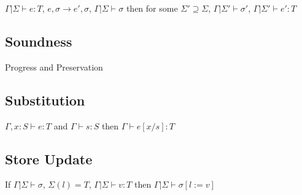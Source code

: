\documentclass[10pt,a4paper]{article}
\begin{document}
$Γ|Σ \vdash e: T$, $e, σ → e', σ$, $Γ|Σ \vdash σ$ then for some $Σ' \supseteq Σ$, $Γ|Σ' \vdash σ'$, $Γ|Σ' \vdash e' : T$

\subsection{Soundness}
Progress and Preservation

\subsection{Substitution}
$Γ, x: S \vdash e:T$ and $Γ \vdash s: S$ then $Γ \vdash e[x/s]:T$

\subsection{Store Update}
If $Γ|Σ \vdash σ$, $Σ(l)= T$, $Γ|Σ \vdash v:T$ then $Γ|Σ \vdash σ[l := v]$
\end{document}
